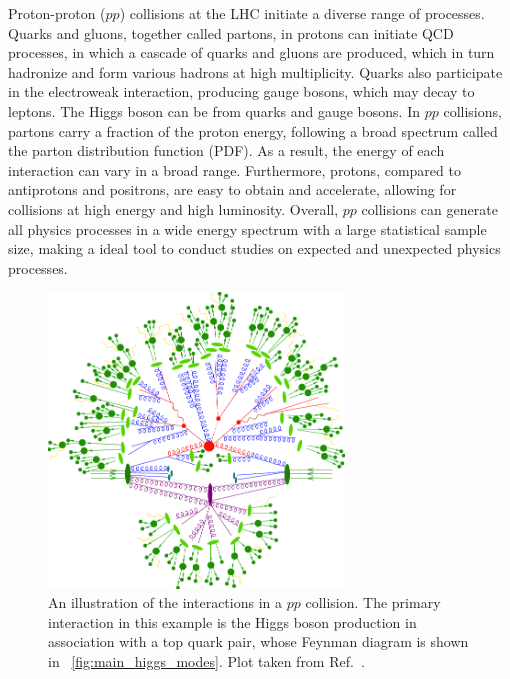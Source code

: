 Proton-proton ($pp$) collisions at the LHC initiate a diverse range of processes.
Quarks and gluons, together called partons, in protons can initiate QCD processes, 
in which a cascade of quarks and gluons are produced, which in turn hadronize and form various hadrons at high multiplicity.
Quarks also participate in the electroweak interaction, producing gauge bosons, which may decay to leptons.
The Higgs boson can be from quarks and gauge bosons.
In $pp$ collisions, partons carry a fraction of the proton energy, 
following a broad spectrum called the parton distribution function (PDF).
As a result, the energy of each interaction can vary in a broad range.
Furthermore, protons, compared to antiprotons and positrons, are easy to obtain and accelerate,
allowing for collisions at high energy and high luminosity.
Overall, $pp$ collisions can generate all physics processes in a wide energy spectrum with a large statistical sample size, 
making a ideal tool to conduct studies on expected and unexpected physics processes. 

\begin{figure}[!htb]
    \centering
    \captionsetup{justification=justified}
    \includegraphics[width=0.70\textwidth]{pics/LHC_CMS/sherpa_sim.png}
    \caption{An illustration of the interactions in a $pp$ collision.
             The primary interaction in this example is the Higgs boson production in association with a top quark pair, 
             whose Feynman diagram is shown in ~\ref{fig:main_higgs_modes}.
             Plot taken from Ref.~\cite{Gleisberg_2009}.}
    \label{fig:sherpa_pp}
\end{figure}


